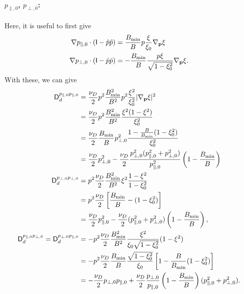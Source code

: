 \documentclass[11pt,a4paper]{article}
\newcommand{\sub}[1]{\ensuremath{_{\text{#1}}}}
\renewcommand{\b}[1]{\ensuremath{ {\bf #1 } }}
\begin{document}
\paragraph{$p_{\parallel,0}$, $p_{\perp,0}$:}
Here, it is useful to first give
\begin{align}
\nabla p_{\parallel,0} \cdot (\mathsf{I}-\hat{p}\hat{p}) &= \frac{B\sub{min}}{B}p\frac{\xi}{\xi_0}\nabla_\b{p}\xi \nonumber \\ %
\nabla p_{\perp,0} \cdot (\mathsf{I}-\hat{p}\hat{p}) &= -\frac{B\sub{min}}{B}\frac{p\xi}{\sqrt{1-\xi_0^2}}\nabla_\b{p}\xi.
\end{align}
With these, we can give 
\begin{align}
\mathsf{D}_d^{p_{\parallel,0}p_{\parallel,0}} &= \frac{\nu_D}{2} p^2 \frac{B\sub{min}^2}{B^2}p^2\frac{\xi^2}{\xi_0^2}|\nabla_\b{p}\xi|^2 \nonumber \\
&= \frac{\nu_D}{2}p^2\frac{B\sub{min}^2}{B^2} \frac{\xi^2(1-\xi^2)}{\xi_0^2} \nonumber \\
&=  \frac{\nu_D}{2}\frac{B\sub{min}}{B} p_{\perp,0}^2\frac{1-\frac{B}{B\sub{min}}(1-\xi_0^2)}{\xi_0^2}  \nonumber \\
&=  \frac{\nu_D}{2}p_{\perp,0}^2-  \frac{\nu_D}{2}\frac{p_{\perp,0}^2(p_{\parallel,0}^2+p_{\perp,0}^2)}{p_{\parallel,0}^2}\left(1-\frac{B\sub{min}}{B}\right)  \nonumber \\
\mathsf{D}_d^{p_{\perp,0}p_{\perp,0}} &= p^2 \frac{\nu_D}{2}\frac{B\sub{min}^2}{B^2} \xi^2\frac{1-\xi^2}{1-\xi_0^2} \nonumber \\
&= p^2  \frac{\nu_D}{2}\left[\frac{B\sub{min}}{B}-(1-\xi_0^2)\right] \nonumber \\
&= \frac{\nu_D}{2}p_{\parallel,0}^2 -  \frac{\nu_D}{2}(p_{\parallel,0}^2+p_{\perp,0}^2) \left(1-\frac{B\sub{min}}{B}\right), \nonumber \\
\mathsf{D}_d^{p_{\parallel,0}p_{\perp,0}} = \mathsf{D}_d^{p_{\perp,0}p_{\parallel,0}} &= -p^2 \frac{\nu_D}{2}\frac{B\sub{min}^2}{B^2}\frac{\xi^2}{\xi_0\sqrt{1-\xi_0^2}}(1-\xi^2) \nonumber \\
&= -p^2 \frac{\nu_D}{2}\frac{B\sub{min}}{B}\frac{\sqrt{1-\xi_0^2}}{\xi_0}\left[1-\frac{B}{B\sub{min}}(1-\xi_0^2)\right] \nonumber \\
&=- \frac{\nu_D}{2} p_{\perp,0}p_{\parallel,0} + \frac{\nu_D}{2} \frac{p_{\perp,0}}{p_{\parallel,0}}\left(1-\frac{B\sub{min}}{B}\right)(p_{\parallel,0}^2+p_{\perp,0}^2). \nonumber
\end{align}
\end{document}

